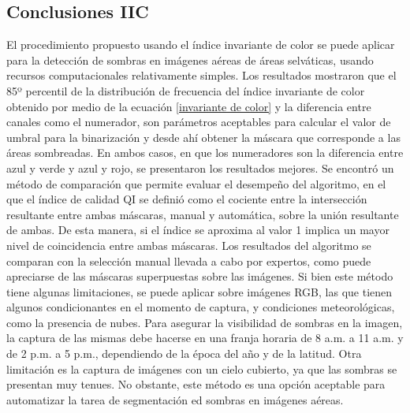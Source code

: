 \subsection{Conclusiones IIC} \label{Conclusiones}

El procedimiento propuesto usando el índice invariante de color se puede aplicar para la detección de sombras en imágenes aéreas de áreas selváticas, usando recursos computacionales relativamente simples. Los resultados mostraron que el 85º percentil de la distribución de frecuencia del índice invariante de color obtenido por medio de la ecuación \ref{invariante de color} y la diferencia entre canales como el numerador, son parámetros aceptables para calcular el valor de umbral para la binarización y desde ahí obtener la máscara que corresponde a las áreas sombreadas.
En ambos casos, en que los numeradores son la diferencia entre azul y verde y azul y rojo, se presentaron los resultados mejores. Se encontró un método de comparación que permite evaluar el desempeño del algoritmo, en el que el índice de calidad QI se definió como el cociente entre la intersección resultante entre ambas máscaras, manual y automática, sobre la unión resultante de ambas. De esta manera, si el índice se aproxima al valor 1 implica un mayor nivel de coincidencia entre ambas máscaras. Los resultados del algoritmo se comparan con la selección manual llevada a cabo por expertos, como puede apreciarse de las máscaras superpuestas sobre las imágenes. Si bien este método tiene algunas limitaciones, se puede aplicar sobre imágenes RGB, las que tienen algunos condicionantes en el momento de captura, y condiciones meteorológicas, como la presencia de nubes. Para asegurar la visibilidad de sombras en la imagen, la captura de las mismas debe hacerse en una franja horaria de 8 a.m. a 11 a.m. y de 2 p.m. a 5 p.m., dependiendo de la época del año y de la latitud. Otra limitación es la captura de imágenes con un cielo cubierto, ya que las sombras se presentan muy tenues. No obstante, este método es una opción aceptable para automatizar la tarea de segmentación ed sombras en imágenes aéreas.
